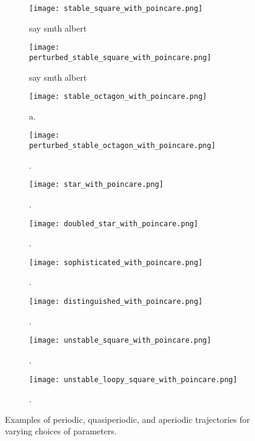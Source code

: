 \begin{figure}[!th]
\centering
\begin{subfigure}{0.49\textwidth}
\centering
\texttt{[image: stable\_square\_with\_poincare.png]}
\caption{say smth albert}
\label{subfig:periodicorbit1}
\end{subfigure}
%
\begin{subfigure}{0.49\textwidth}
\texttt{[image: perturbed\_stable\_square\_with\_poincare.png]}
\caption{say smth albert}
\label{subfig:periodicorbit2}
\end{subfigure}
%
\begin{subfigure}{0.49\textwidth}
\texttt{[image: stable\_octagon\_with\_poincare.png]}
\caption{a.}
\label{subfig:periodicorbit3}
\end{subfigure}
%
\begin{subfigure}{0.49\textwidth}
\texttt{[image: perturbed\_stable\_octagon\_with\_poincare.png]}
\caption{.}
\label{subfig:periodicorbit4}
\end{subfigure}
%
\begin{subfigure}{0.49\textwidth}
\texttt{[image: star\_with\_poincare.png]}
\caption{.}
\label{subfig:periodicorbit5}
\end{subfigure}
%
\begin{subfigure}{0.49\textwidth}
\texttt{[image: doubled\_star\_with\_poincare.png]}
\caption{.}
\label{subfig:periodicorbit6}
\end{subfigure}
%
\begin{subfigure}{0.49\textwidth}
\texttt{[image: sophisticated\_with\_poincare.png]}
\caption{.}
\label{subfig:periodicorbit7}
\end{subfigure}
%
\begin{subfigure}{0.49\textwidth}
\texttt{[image: distinguished\_with\_poincare.png]}
\caption{.}
\label{subfig:periodicorbit8}
\end{subfigure}
%
\begin{subfigure}{0.49\textwidth}
\texttt{[image: unstable\_square\_with\_poincare.png]}
\caption{.}
\label{subfig:periodicorbit9}
\end{subfigure}
%
\begin{subfigure}{0.49\textwidth}
\texttt{[image: unstable\_loopy\_square\_with\_poincare.png]}
\caption{.}
\label{subfig:periodicorbit10}
\end{subfigure}
\caption{Examples of periodic, quasiperiodic, and aperiodic trajectories for varying choices of parameters.}
\label{fig:periodicorbits}
\end{figure}


